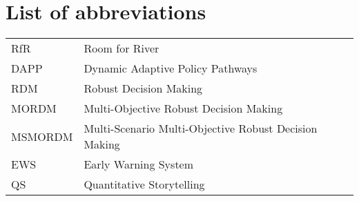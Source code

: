\section*{List of abbreviations}
\label{s:gloss}
\begin{table}[h!]
\begin{tabular}{ll}
 RfR &  Room for River \\
 DAPP & Dynamic Adaptive Policy Pathways \\
 RDM &  Robust Decision Making \\
 MORDM & Multi-Objective Robust Decision Making \\
 MSMORDM & Multi-Scenario Multi-Objective Robust Decision Making \\
 EWS & Early Warning System \\
 QS & Quantitative Storytelling \\
\end{tabular}
\end{table}